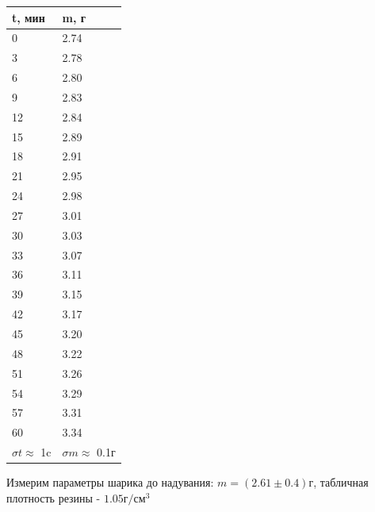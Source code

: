 \begin{table}[h!]

\begin{minipage}{0.3\textwidth}
\begin{tabular}{|l|l|}
\hline
t, мин                & m, г                     \\ \hline
0                     & 2.74                     \\ \hline
3                     & 2.78                     \\ \hline
6                     & 2.80                     \\ \hline
9                     & 2.83                     \\ \hline
12                    & 2.84                     \\ \hline
15                    & 2.89                     \\ \hline
18                    & 2.91                     \\ \hline
21                    & 2.95                     \\ \hline
24                    & 2.98                     \\ \hline
27                    & 3.01                     \\ \hline
30                    & 3.03                     \\ \hline
33                    & 3.07                     \\ \hline
36                    & 3.11                     \\ \hline
39                    & 3.15                     \\ \hline
42                    & 3.17                     \\ \hline
45                    & 3.20                     \\ \hline
48                    & 3.22                     \\ \hline
51                    & 3.26                     \\ \hline
54                    & 3.29                     \\ \hline
57                    & 3.31                     \\ \hline
60                    & 3.34                     \\ \hline
$\sigma t \approx$ 1c & $\sigma m \approx$ 0.1г \\ \hline
\end{tabular}
\end{minipage}
\begin{minipage}{0.7\textwidth}
Измерим параметры шарика до надувания: $m = (2.61 \pm 0.4)г$, табличная плотность резины - $1.05 г/см^3$


\end{minipage}
\end{table}
